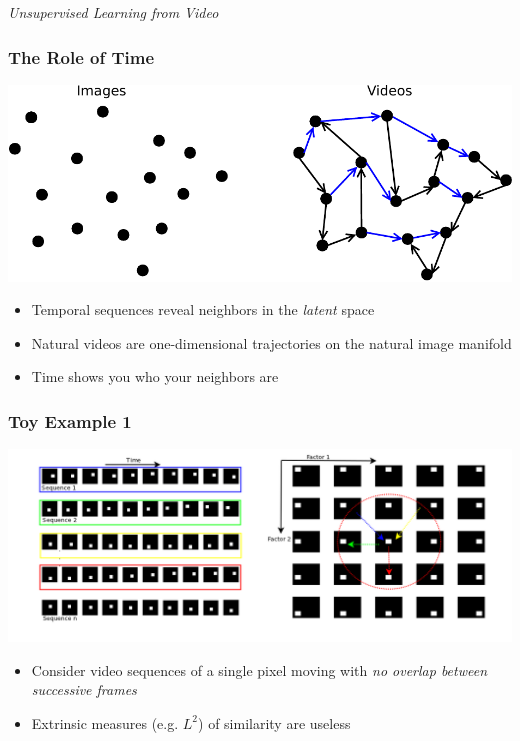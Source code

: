 \documentclass{beamer}
\begin{document}
\begin{frame}
\begin{columns}[T]
\begin{column}{.4\textwidth}
\end{column}
\end{columns}
\end{frame}

\begin{frame}
\begin{center} 
\huge \color{blue} \emph{Unsupervised Learning from Video}
\end{center} 
\end{frame} 

\begin{frame} 
\frametitle{The Role of Time}
\begin{center} 
\includegraphics[scale=0.4]{./Figures/time.pdf}
\end{center} 
\begin{itemize} 
\item{Temporal sequences reveal neighbors in the \emph{latent} space}
\item{Natural videos are one-dimensional trajectories on the natural image manifold}
\item{Time shows you who your neighbors are}
\end{itemize} 
\end{frame} 

\begin{frame} 
\frametitle{Toy Example 1}
\begin{center} 
\includegraphics[scale=0.25]{./Figures/toy_video.png}
\end{center} 
\begin{itemize} 
\item{Consider video sequences of a single pixel moving with \emph{no overlap between successive frames}}
\item{Extrinsic measures (e.g. $L^2$) of similarity are useless}
\end{itemize} 
\end{frame} 
\end{document}

